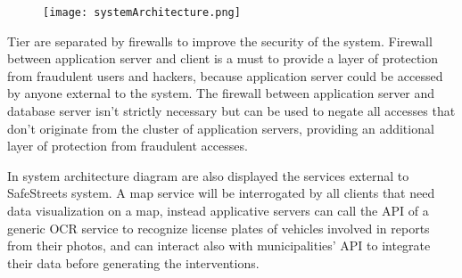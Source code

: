 \begin{figure}[H]
	\texttt{[image: systemArchitecture.png]}
\end{figure}

Tier are separated by firewalls to improve the security of the system. Firewall between application server and client is a must to provide a layer of protection from fraudulent users and hackers, because application server could be accessed by anyone external to the system. The firewall between application server and database server isn't strictly necessary but can be used to negate all accesses that don't originate from the cluster of application servers, providing an additional layer of protection from fraudulent accesses.

In system architecture diagram are also displayed the services external to SafeStreets system. A map service will be interrogated by all clients that need data visualization on a map, instead applicative servers can call the API of a generic OCR service to recognize license plates of vehicles involved in reports from their photos, and can interact also with municipalities' API to integrate their data before generating the interventions. 
